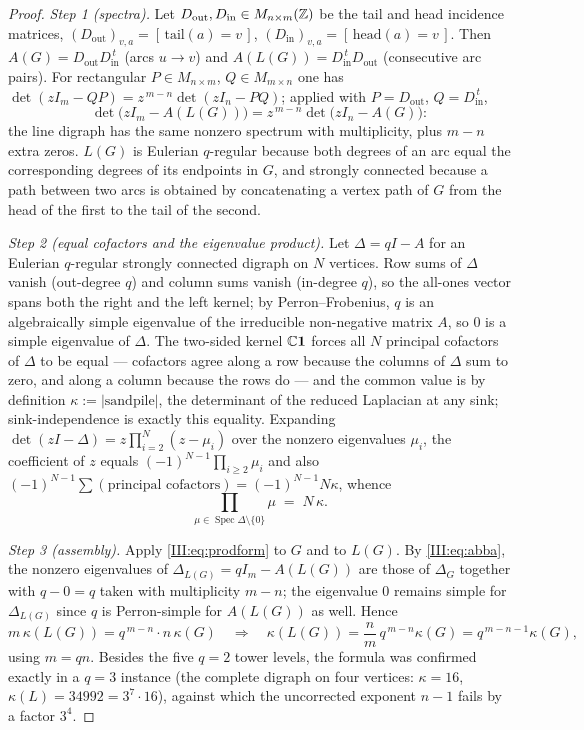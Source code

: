 \begin{proof}
\emph{Step 1 (spectra).} Let $D_{\mathrm{out}},D_{\mathrm{in}}\in M_{n\times m}(\mathbb{Z})$
be the tail and head incidence matrices, $(D_{\mathrm{out}})_{v,a}=[\,\mathrm{tail}(a)
=v\,]$, $(D_{\mathrm{in}})_{v,a}=[\,\mathrm{head}(a)=v\,]$. Then
$A(G)=D_{\mathrm{out}}D_{\mathrm{in}}^{\,t}$ (arcs $u\to v$) and
$A(L(G))=D_{\mathrm{in}}^{\,t}D_{\mathrm{out}}$ (consecutive arc pairs). For
rectangular $P\in M_{n\times m}$, $Q\in M_{m\times n}$ one has
$\det(zI_m-QP)=z^{\,m-n}\det(zI_n-PQ)$; applied with $P=D_{\mathrm{out}}$,
$Q=D_{\mathrm{in}}^{\,t}$,
\begin{equation}\label{III:eq:abba}
\det\bigl(zI_m-A(L(G))\bigr)=z^{\,m-n}\det\bigl(zI_n-A(G)\bigr):
\end{equation}
the line digraph has the same nonzero spectrum with multiplicity, plus $m-n$ extra
zeros. $L(G)$ is Eulerian $q$-regular because both degrees of an arc equal the
corresponding degrees of its endpoints in $G$, and strongly connected because a path
between two arcs is obtained by concatenating a vertex path of $G$ from the head of
the first to the tail of the second.

\emph{Step 2 (equal cofactors and the eigenvalue product).} Let
$\Delta=qI-A$ for an Eulerian $q$-regular strongly connected digraph on $N$ vertices.
Row sums of $\Delta$ vanish (out-degree $q$) and column sums vanish (in-degree $q$),
so the all-ones vector spans both the right and the left kernel; by Perron--Frobenius,
$q$ is an algebraically simple eigenvalue of the irreducible non-negative matrix $A$,
so $0$ is a simple eigenvalue of $\Delta$. The two-sided kernel $\mathbb{C}\mathbf1$ forces
all $N$ principal cofactors of $\Delta$ to be equal --- cofactors agree along a row
because the columns of $\Delta$ sum to zero, and along a column because the rows do
--- and the common value is by definition $\kappa:=|\mathrm{sandpile}|$, the
determinant of the reduced Laplacian at any sink; sink-independence is exactly this
equality. Expanding $\det(zI-\Delta)=z\prod_{i=2}^{N}(z-\mu_i)$ over the nonzero
eigenvalues $\mu_i$, the coefficient of $z$ equals $(-1)^{N-1}\prod_{i\ge2}\mu_i$ and
also $(-1)^{N-1}\sum(\text{principal cofactors})=(-1)^{N-1}N\kappa$, whence
\begin{equation}\label{III:eq:prodform}
\prod_{\mu\in\operatorname{Spec}\Delta\setminus\{0\}}\mu\;=\;N\,\kappa .
\end{equation}

\emph{Step 3 (assembly).} Apply \eqref{III:eq:prodform} to $G$ and to $L(G)$. By
\eqref{III:eq:abba}, the nonzero eigenvalues of $\Delta_{L(G)}=qI_m-A(L(G))$ are those of
$\Delta_G$ together with $q-0=q$ taken with multiplicity $m-n$; the eigenvalue $0$
remains simple for $\Delta_{L(G)}$ since $q$ is Perron-simple for $A(L(G))$ as well.
Hence
\[
m\,\kappa(L(G))=q^{\,m-n}\cdot n\,\kappa(G)
\quad\Longrightarrow\quad
\kappa(L(G))=\frac{n}{m}\,q^{\,m-n}\kappa(G)=q^{\,m-n-1}\kappa(G),
\]
using $m=qn$. Besides the five $q=2$ tower levels, the formula was confirmed exactly
in a $q=3$ instance (the complete digraph on four vertices: $\kappa=16$,
$\kappa(L)=34992=3^{7}\cdot16$), against which the uncorrected exponent $n-1$ fails by
a factor $3^{4}$.
\end{proof}

